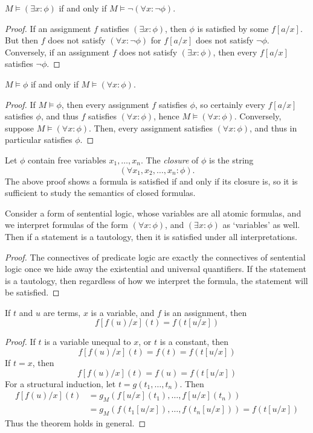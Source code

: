 \begin{lemma} $M \vDash (\exists x: \phi)$ if and only if $M \vDash \neg (\forall x: \neg \phi)$. \end{lemma}
\begin{proof}
    If an assignment $f$ satisfies $(\exists x: \phi)$, then $\phi$ is satisfied by some $f[a/x]$. But then $f$ does not satisfy $(\forall x: \neg \phi)$ for $f[a/x]$ does not satisfy $\neg \phi$. Conversely, if an assignment $f$ does not satisfy $(\exists x: \phi)$, then every $f[a/x]$ satisfies $\neg \phi$.
\end{proof}

\begin{lemma}
    $M \vDash \phi$ if and only if $M \vDash (\forall x: \phi)$.
\end{lemma}
\begin{proof}
    If $M \vDash \phi$, then every assignment $f$ satisfies $\phi$, so certainly every $f[a/x]$ satisfies $\phi$, and thus $f$ satisfies $(\forall x: \phi)$, hence $M \vDash (\forall x: \phi)$. Conversely, suppose $M \vDash (\forall x: \phi)$. Then, every assignment satisfies $(\forall x: \phi)$, and thus in particular satisfies $\phi$.
\end{proof}

Let $\phi$ contain free variables $x_1, \dots, x_n$. The \emph{closure} of $\phi$ is the string
%
\[ (\forall x_1, x_2, \dots, x_n: \phi). \]
%
The above proof shows a formula is satisfied if and only if its closure is, so it is sufficient to study the semantics of closed formulas.

\begin{theorem}
    Consider a form of sentential logic, whose variables are all atomic formulas, and we interpret formulas of the form $(\forall x: \phi)$, and $(\exists x: \phi)$ as `variables' as well. Then if a statement is a tautology, then it is satisfied under all interpretations.
\end{theorem}
\begin{proof}
    The connectives of predicate logic are exactly the connectives of sentential logic once we hide away the existential and universal quantifiers. If the statement is a tautology, then regardless of how we interpret the formula, the statement will be satisfied.
\end{proof}

\begin{lemma}
    If $t$ and $u$ are terms, $x$ is a variable, and $f$ is an assignment, then
    \[ f[f(u)/x](t) = f(t[u/x]) \]
\end{lemma}
\begin{proof}
    If $t$ is a variable unequal to $x$, or $t$ is a constant, then
    \[ f[f(u)/x](t) = f(t) = f(t[u/x]) \]
    If $t = x$, then
    \[ f[f(u)/x](t) = f(u) = f(t[u/x]) \]
    For a structural induction, let $t = g(t_1, \dots, t_n)$. Then
    \begin{align*}
        f[f(u)/x](t) &= g_M(f[u/x](t_1), \dots, f[u/x](t_n))\\
        &= g_M(f(t_1[u/x]), \dots, f(t_n[u/x])) = f(t[u/x])
    \end{align*}
    Thus the theorem holds in general.
\end{proof}

